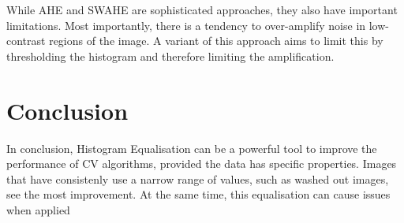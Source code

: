 \documentclass{article}
\begin{document}
While AHE and SWAHE are sophisticated approaches, they also have important limitations. Most importantly, there is a tendency to over-amplify noise in low-contrast regions of the image. A variant of this approach aims to limit this by thresholding the histogram and therefore limiting the amplification.

\section{Conclusion}
In conclusion, Histogram Equalisation can be a powerful tool to improve the performance of CV algorithms, provided the data has specific properties. Images that have consistenly use a narrow range of values, such as washed out images, see the most improvement. At the same time, this equalisation can cause issues when applied 
\end{document}
